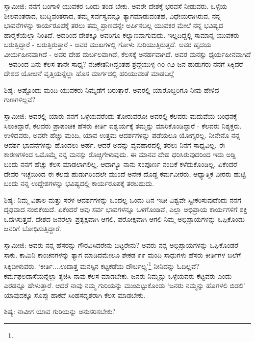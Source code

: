 ಸ್ವಾಮೀಜಿ: ನನಗೆ ಬಂಗಾಳಿ ಯುವಕರ ಒಂದು ತಂಡ ಬೇಕು. ಅವರೇ ದೇಶಕ್ಕೆ ಭರವಸೆ ನೀಡುವರು. ಒಳ್ಳೆಯ ಶೀಲವಂತರಾದ, ಬುದ್ಧಿವಂತರಾದ, ತಮ್ಮ ಸರ್ವಸ್ವವನ್ನೂ ತ್ಯಾಗಮಾಡುವಂತಹ, ವಿಧೇಯರಾಗಿರುವ, ನನ್ನ ಭಾವನೆಗಳನ್ನು ಕಾರ್ಯರೂಪಕ್ಕೆ ತರಲು ತಮ್ಮ ಪ್ರಾಣವನ್ನೇ ಅರ್ಪಿಸಬಲ್ಲ ಯುವಕರ ಮೇಲೆ ನನ್ನ ಭವಿಷ್ಯದ ಹಾರೈಕೆಯೆಲ್ಲಾ ನಿಂತಿದೆ. ಅದರಿಂದ ದೇಶಕ್ಕೂ ಅವರಿಗೂ ಕಲ್ಯಾಣವಾಗುವುದು. ಇಲ್ಲದಿದ್ದಲ್ಲಿ ಸಾಮಾನ್ಯ ಯುವಕರು ಬರುತ್ತಿದ್ದಾರೆ - ಬರುತ್ತಿರುತ್ತಾರೆ - ಅವರ ಮುಖಗಳಲ್ಲಿ ಗೋಳು ಸುರಿಯುತ್ತಿರುತ್ತದೆ. ಅವರ ಹೃದಯ ವೀರ್ಯಹೀನವಾಗಿದೆ - ಅವರ ದೇಹ ದುರ್ಬಲವಾಗಿದೆ, ಕೆಲಸಕ್ಕೆ ಅನರ್ಹವಾಗಿದೆ. ಅವರ ಮನಸ್ಸು ಧೈರ್ಯಹೀನವಾಗಿದೆ - ಅವರಿಂದ ಏನು ಕೆಲಸ ತಾನೇ ಸಾಧ್ಯ? ನಚಿಕೇತನಿಗಿದ್ದಂತಹ ಶ್ರದ್ಧೆಯುಳ್ಳ ೧೦-೧೨ ಜನ ಹುಡುಗರು ನನಗೆ ಸಿಕ್ಕಿದರೆ ದೇಶದ ಯೋಚನೆ ವೃತ್ತಿಯನ್ನೆಲ್ಲಾ ಹೊಸ ಮಾರ್ಗದಲ್ಲಿ ಹರಿಯುವಂತೆ ಮಾಡಬಲ್ಲೆ

ಶಿಷ್ಯ: ಅಷ್ಟೊಂದು ಮಂದಿ ಯುವಕರು ನಿಮ್ಮೆಡೆಗೆ ಬರುತ್ತಾರೆ. ಅವರಲ್ಲಿ ಯಾರೊಬ್ಬರಿಗೂ ನೀವು ಹೇಳಿದ ಗುಣಗಳಿಲ್ಲವೆ?

ಸ್ವಾಮೀಜಿ: ಅವರಲ್ಲಿ ಯಾರು ನನಗೆ ಒಳ್ಳೆಯವರೆಂದು ತೋರುವರೋ ಅವರಲ್ಲಿ ಕೆಲವರು ಮದುವೆಯ ಬಂಧನಕ್ಕೆ ಸಿಲುಕಿದ್ದಾರೆ, ಕೆಲವರು ಪ್ರಾಪಂಚಿಕ ಹೆಸರು ಕೀರ್ತಿ ಐಶ್ವರ್ಯಕ್ಕೆ ತಮ್ಮನ್ನು ಮಾರಿಕೊಂಡಿದ್ದಾರೆ - ಕೆಲವರು ನಿಶ್ಶಕ್ತರು. ಉಳಿದವರು, ಅವರೇ ಹೆಚ್ಚು ಮಂದಿ, ಯಾವ ಉತ್ತಮ ಆದರ್ಶಗಳನ್ನು ಪಡೆಯಲೂ ಯೋಗ್ಯರಲ್ಲ. ನೀನೇನೊ ನನ್ನ ಆದರ್ಶ ಭಾವನೆಗಳನ್ನು ಹೊಂದಲು ಅರ್ಹ. ಆದರೆ ಅದನ್ನು ವ್ಯವಹಾರದಲ್ಲಿ ತರಲು ನಿನಗೆ ಸಾಧ್ಯವಿಲ್ಲ. ಈ ಕಾರಣಗಳಿಂದ ಒಮೊಮ್ಮೆ ನನ್ನ ಮನಸ್ಸು ರೊಚ್ಚಿಗೇಳುವುದು. ಈ ಮಾನವ ದೇಹ ಧರಿಸಿರುವುದರಿಂದ ಇದು ಅಡ್ಡಿ ಬಂದು ನನಗೆ ಹೆಚ್ಚು ಕೆಲಸ ಮಾಡಲಾಗಲಿಲ್ಲ. ಆದಾಗ್ಯೂ ನಾನು ಸಂಪೂರ್ಣ ನಂಬಿಕೆ ಕಳೆದುಕೊಂಡಿಲ್ಲ. ಏಕೆಂದರೆ ದೇವರ ಇಚ್ಛೆಯಿಂದ ಈ ಕೆಲವು ಹುಡುಗರಿಂದಲೇ ಮುಂದೆ ಅನೇಕ ದೊಡ್ಡ ಕರ್ಮವೀರರು, ಆಧ್ಯಾತ್ಮಿಕ ವೀರರು ಹುಟ್ಟಿ ಬಂದು ನನ್ನ ಉದ್ದೇಶಗಳನ್ನು ಭವಿಷ್ಯದಲ್ಲಿ ಕಾರ್ಯರೂಪಕ್ಕೆ ತರಬಹುದು.

ಶಿಷ್ಯ: ನಿಮ್ಮ ವಿಶಾಲ ಮತ್ತು ಸರಳ ಆದರ್ಶಗಳನ್ನು ಒಂದಲ್ಲ ಒಂದು ದಿನ ಇಡೀ ವಿಶ್ವವೇ ಸ್ವೀಕರಿಸುವುದೆಂದು ನನಗೆ ದೃಢವಾದ ನಂಬಿಕೆಯಿದೆ. ಏಕೆಂದರೆ ಅವು ಸರ್ವ ಭಾವಗಳನ್ನೂ ಒಳಗೊಂಡಿವೆ, ಎಲ್ಲಾ ಅಭಿಪ್ರಾಯ ಕಾರ್ಯಗಳಿಗೆ ಶಕ್ತಿ ಒದಗಿಸುತ್ತವೆ. ದೇಶದ ಜನರೆಲ್ಲಾ ಪ್ರತ್ಯಕ್ಷವಾಗಿ ಆಗಲಿ, ಪರೋಕ್ಷವಾಗಿ ಆಗಲಿ ನಿಮ್ಮ ಅಭಿಪ್ರಾಯಗಳನ್ನು ಒಪ್ಪಿಕೊಂಡು ಜನರಿಗೆ ಬೋಧಿಸುತ್ತಿದ್ದಾರೆ.

ಸ್ವಾಮೀಜಿ: ಅವರು ನನ್ನ ಹೆಸರನ್ನು ಗೌರವಿಸಿದರೇನು ಬಿಟ್ಟರೇನು? ಅವರು ನನ್ನ ಅಭಿಪ್ರಾಯಗಳನ್ನು ಒಪ್ಪಿಕೊಂಡರೆ ಸಾಕು. ಕಾಮಿನಿ ಕಾಂಚನಗಳನ್ನು ತ್ಯಾಗ ಮಾಡಿದಮೇಲೂ ಶೇಕಡ ೯೯ ಮಂದಿ ಸಾಧುಗಳು ಹೆಸರು ಕೀರ್ತಿಗಳ ಬಲೆಗೆ ಸಿಕ್ಕಿಬೀಳುವರು. ‘ಕೀರ್ತಿ....ಉದಾತ್ತ ಮನಸ್ಸಿನ ಕಟ್ಟಕಡೆಯ ದೌರ್ಬಲ್ಯ’\footnote{} ನೀನಿದನ್ನು ಓದಿಲ್ಲವೆ? ಕರ್ಮಫಲದಾಸೆಯನ್ನೆಲ್ಲಾ ತ್ಯಜಿಸಿ ನಾವು ಕೆಲಸ ಮಾಡಬೇಕು. ಜನರು ನಿಮ್ಮನ್ನು ಒಳ್ಳೆಯವರು ಕೆಟ್ಟವರು ಎಂದು ಎರಡನ್ನೂ ಹೇಳುತ್ತಾರೆ. ಆದರೆ ನಾವು ನಮ್ಮ ಗುರಿಯನ್ನು ಮುಂದಿಟ್ಟುಕೊಂಡು ‘ಜನರು ನಮ್ಮನ್ನು ಹೊಗಳಲಿ ಬಿಡಲಿ’ ಯಾವುದಕ್ಕೂ ಸೊಪ್ಪು ಹಾಕದೆ ಸಿಂಹಸದೃಶರಾಗಿ ಕೆಲಸ ಮಾಡಬೇಕು.

ಶಿಷ್ಯ: ನಾವೀಗ ಯಾವ ಗುರಿಯನ್ನು ಅನುಸರಿಸಬೇಕು?


